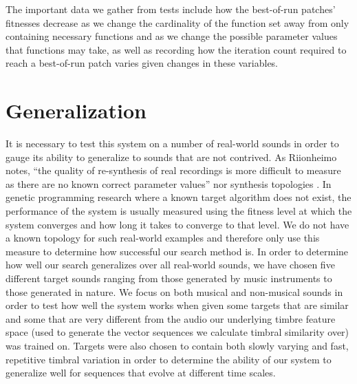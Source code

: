 \documentclass[a4paper,12pt]{report} 	%
\numberwithin{figure}{chapter}
\numberwithin{table}{chapter}
\numberwithin{equation}{chapter}
\begin{document}
\begin{flushleft}
The important data we gather from tests include how the best-of-run patches' fitnesses decrease as we change the cardinality of the function set away from only containing necessary functions and as we change the possible parameter values that functions may take, as well as recording how the iteration count required to reach a best-of-run patch varies given changes in these variables.

\section{Generalization}
It is necessary to test this system on a number of real-world sounds in order to gauge its ability to generalize to sounds that are not contrived. As Riionheimo notes, ``the quality of re-synthesis of real recordings is more difficult to measure as there are no known correct parameter values'' nor synthesis topologies \cite[p. 13]{Riionheimo:2003qo}. In genetic programming research where a known target algorithm does not exist, the performance of the system is usually measured using the fitness level at which the system converges and how long it takes to converge to that level. We do not have a known topology for such real-world examples and therefore only use this measure to determine how successful our search method is. In order to determine how well our search generalizes over all real-world sounds, we have chosen five different target sounds ranging from those generated by music instruments to those generated in nature. We focus on both musical and non-musical sounds in order to test how well the system works when given some targets that are similar and some that are very different from the audio our underlying timbre feature space (used to generate the vector sequences we calculate timbral similarity over) was trained on. Targets were also chosen to contain both slowly varying and fast, repetitive timbral variation in order to determine the ability of our system to generalize well for sequences that evolve at different time scales.


\end{flushleft}
\end{document}
